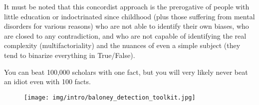 	It must be noted that this concordist approach is the prerogative of people with little education or indoctrinated since childhood (plus those suffering from mental disorders for various reasons) who are not able to identify their own biases, who are closed to any contradiction, and who are not capable of identifying the real complexity (multifactoriality) and the nuances of even a simple subject (they tend to binarize everything in True/False).
	
	\begin{fquote}You can beat 100,000 scholars with one fact, but you will very likely never beat an idiot even with 100 facts.
 	\end{fquote}
	
	\begin{figure}[H]
		\centering
		\texttt{[image: img/intro/baloney\_detection\_toolkit.jpg]}
	\end{figure}
	
